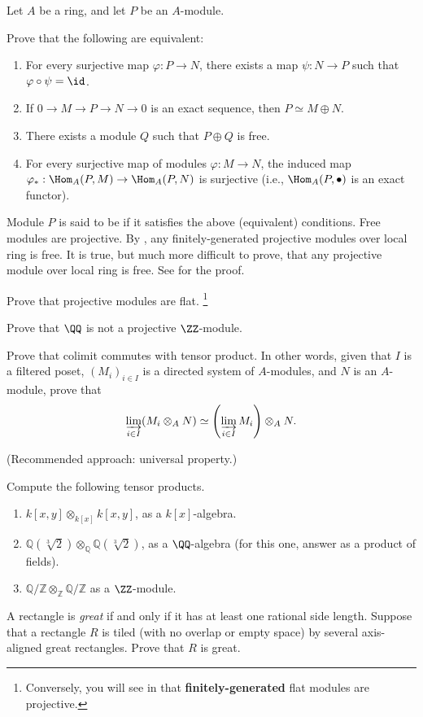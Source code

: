 \begin{problem}
\label{prob:projective}
Let $A$ be a ring, and let $P$ be an $A$-module.
\begin{alphenum}
\item Prove that the following are equivalent:
\begin{enumerate}[label=(\roman*)]
\item For every surjective map $\varphi : P\to N$,
there exists a map $\psi : N\to P$ such that $\varphi\circ \psi = \id$.
\item If $0\to M\to P\to N\to 0$ is an exact sequence,
then $P\simeq M\oplus N$.
\item There exists a module $Q$ such that $P\oplus Q$ is free.
\item For every surjective map of modules $\varphi : M\to N$,
the induced map $\varphi_* : \Hom_A(P,M)\to\Hom_A(P,N)$ 
is surjective (i.e., $\Hom_A(P,\bullet)$ is an exact functor).
\end{enumerate}
Module $P$ is said to be  if it satisfies the above (equivalent) conditions.
Free modules are projective.
By ,
any finitely-generated projective modules over local ring is free.
It is true, but much more difficult to prove, that any projective module over local ring is free.
See \cite[Tag 0593]{stacks} for the proof.
\item Prove that projective modules are flat.%
\footnote{Conversely, you will see in  that \textbf{finitely-generated} flat modules are projective.}
\item Prove that $\QQ$ is not a projective $\ZZ$-module.
\end{alphenum}
\end{problem}
\begin{problem}
\label{prob:colimit_tensor}
Prove that colimit commutes with tensor product.
In other words, given that $I$ is a filtered poset,
$(M_i)_{i\in I}$ is a directed system of $A$-modules,
and $N$ is an $A$-module, prove that
$$\varinjlim_{i\in I} (M_i\otimes_A N) 
\simeq \left(\varinjlim_{i\in I} M_i\right) \otimes_A N.$$

(Recommended approach: universal property.)
\end{problem}
\begin{problem}
Compute the following tensor products.
\begin{enumerate}[label=(\alph*)]
\item $k[x,y] \otimes_{k[x]} k[x,y]$, as a $k[x]$-algebra.
\item $\mathbb Q(\sqrt[3] 2) \otimes_{\mathbb Q} \mathbb Q(\sqrt[3] 2)$, as a $\QQ$-algebra 
(for this one, answer as a product of fields).
\item $\mathbb Q/\mathbb Z \otimes_{\mathbb Z} \mathbb Q/\mathbb Z$ as a $\ZZ$-module.
\end{enumerate}
\end{problem}
\begin{problem}
A rectangle is \emph{great} if and only if it has at least one rational side length. Suppose that a rectangle $R$ is tiled (with no overlap or empty space) by several axis-aligned great rectangles. Prove that $R$ is great.
\end{problem}